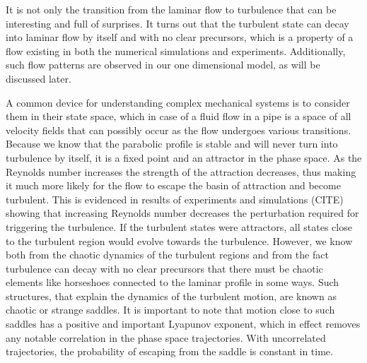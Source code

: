 \documentclass[11pt,a4paper]{article}
\begin{document}
It is not only the transition from the laminar flow to turbulence that can be interesting and full of surprises.
It turns out that the turbulent state can decay into laminar flow by itself and with no clear precursors, which is a property of a flow existing in both the numerical simulations\cite{Brosa89}\cite{Faisst04} and experiments\cite{Darbyshire95}\cite{Hof04}\cite{Mullin06}.
Additionally, such flow patterns are observed in our one dimensional model, as will be discussed later.

A common device for understanding complex mechanical systems is to consider them in their state space, which in case of a fluid flow in a pipe\cite{Lanford82} is a space of all velocity fields that can possibly occur as the flow undergoes various transitions.
Because we know that the parabolic profile is stable\cite{Eckhardt07} and will never turn into turbulence by itself, it is a fixed point and an attractor in the phase space.
As the Reynolds number increases the strength of the attraction decreases, thus making it much more likely for the flow to escape the basin of attraction and become turbulent.
This is evidenced in results of experiments and simulations (CITE) showing that increasing Reynolds number decreases the perturbation required for triggering the turbulence.
If the turbulent states were attractors\cite{Guckenheimer86}\cite{Lanford82}, all states close to the turbulent region would evolve towards the turbulence.
However, we know both from the chaotic dynamics of the turbulent regions and from the fact turbulence can decay with no clear precursors that there must be chaotic elements\cite{Guckenheimer83} like horseshoes connected to the laminar profile in some ways.
Such structures, that explain the dynamics of the turbulent motion, are known as chaotic or strange saddles.
It is important to note that motion close to such saddles has a positive and important Lyapunov exponent, which in effect removes any notable correlation in the phase space trajectories.
With uncorrelated trajectories, the probability of escaping from the saddle is constant in time.
\end{document}
